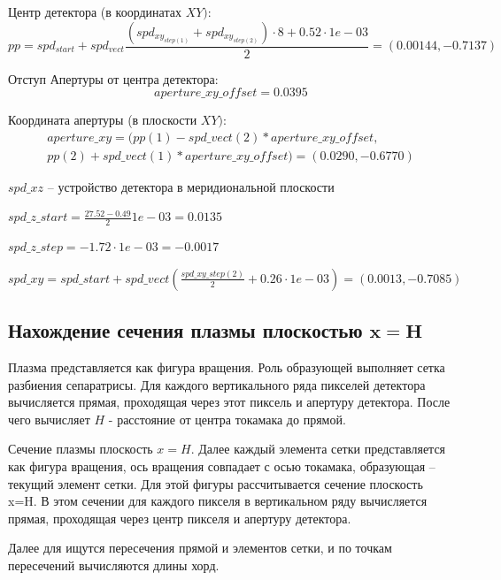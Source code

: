 \documentclass[a4]{article}
\begin{document}
Центр детектора (в координатах $XY):$
$$pp=spd_{start}+spd_{vect}\frac{\left(spd_{xy_{step(1)}}+spd_{xy_{step(2)}}\right)\cdot 8+0.52\cdot 1e-03}{2}=(0.00144,-0.7137)$$
\vspace{1mm}

Отступ Апертуры от центра детектора: 
$$aperture\_xy\_offset = 0.0395$$
\vspace{1mm}

Координата апертуры (в плоскости $XY):$ 
\vspace{-2mm}
\begin{multline*}
aperture\_xy =(pp(1) - spd\_vect(2) * aperture\_xy\_offset,\\   pp(2) + spd\_vect(1) * aperture\_xy\_offset) = (0.0290,-0.6770)
\end{multline*}
\vspace{1mm}

$spd\_xz$ – устройство детектора в меридиональной плоскости
\vspace{1mm}

$spd\_z\_start=\frac{27.52-0.49}{2}1e-03=0.0135$
\vspace{1mm}

$spd\_z\_step= -1.72 \cdot 1e-03= -0.0017$
\vspace{1mm}

$spd\_xy=spd\_start+spd\_vect\left(\frac{spd\_xy\_step(2)}{2}+0.26\cdot 1e-03\right)=(0.0013,-0.7085)$

\subsection{Нахождение сечения плазмы плоскостью $\mathbf{x = H}$}
Плазма представляется как фигура вращения. Роль образующей выполняет сетка разбиения сепаратрисы. Для каждого вертикального ряда пикселей детектора вычисляется прямая, проходящая через этот пиксель и апертуру детектора. После чего вычисляет $H$ - расстояние от центра токамака до прямой.

Сечение плазмы плоскость $x = H.$ Далее каждый элемента сетки представляется как фигура вращения, ось вращения совпадает с осью токамака, образующая – текущий элемент сетки. Для этой фигуры рассчитывается сечение плоскость x=H.
В этом сечении для каждого пикселя в вертикальном ряду вычисляется прямая, проходящая через центр пикселя и апертуру детектора.

Далее для ищутся пересечения прямой и элементов сетки, и по точкам пересечений вычисляются длины хорд.
\end{document}
